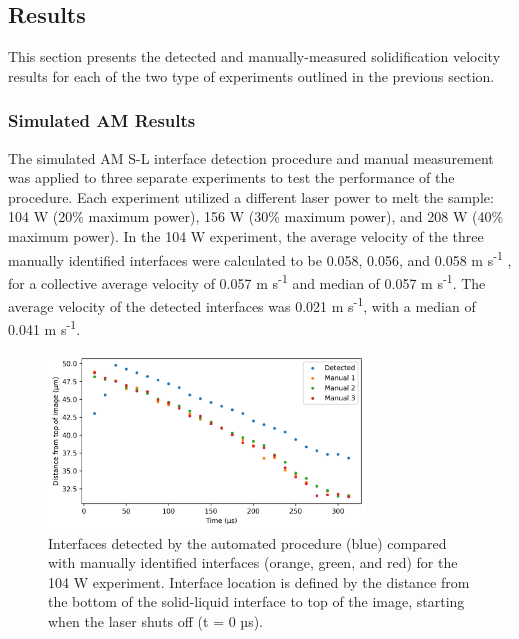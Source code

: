 \subsection{Results}
This section presents the detected and manually-measured solidification
velocity results for each
of the two type of experiments outlined in the previous section.

\subsubsection{Simulated AM Results}
The simulated AM S-L interface detection procedure and manual measurement
was applied to three separate experiments to test the performance of the
procedure.
Each experiment utilized a
different laser power to melt the sample: 104 W (20\% maximum power),
156 W (30\% maximum power), and 208 W (40\% maximum power).
In the 104 W experiment, the average velocity of the three
manually identified interfaces were calculated to be 0.058, 0.056, and 0.058
m s\textsuperscript{-1} , for a collective average velocity of 0.057
m s\textsuperscript{-1} and median of 0.057 m s\textsuperscript{-1}. The
average velocity of the detected interfaces was 0.021 m s\textsuperscript{-1},
with a median of 0.041 m s\textsuperscript{-1}.

\begin{figure}[ht]
    \centering
    \includegraphics[width=0.75\textwidth]{figures/04/12-detected-vs-manual-1-10_shot05.png}
    \caption{
        \small{}
        Interfaces detected by the automated procedure (blue) compared with
        manually identified interfaces (orange, green, and red) for the
        104 W experiment. Interface location is defined by the distance from
        the bottom of the solid-liquid interface to top of the image,
        starting when the laser shuts off (t = 0 µs).
    }
    \label{fig/detected-aps-1}
\end{figure}

